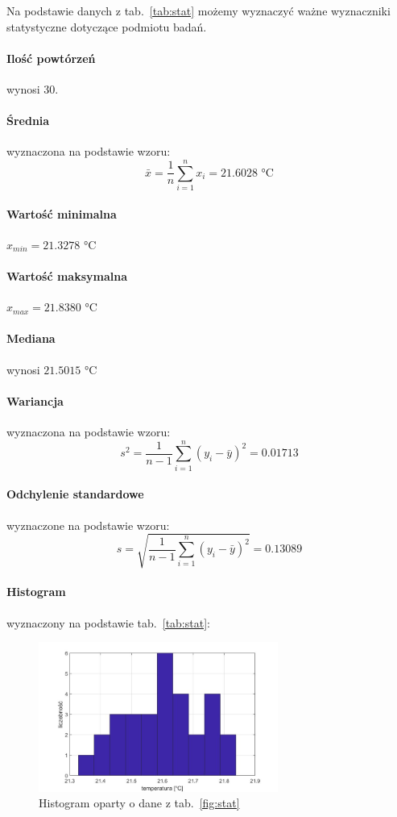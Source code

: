 \documentclass[a4paper, 12pt]{mwart}
\begin{document}
			Na podstawie danych z tab.~\ref{tab:stat} możemy wyznaczyć ważne wyznaczniki statystyczne
			dotyczące podmiotu badań.

			\paragraph{Ilość powtórzeń} wynosi 30.
			\paragraph{Średnia} wyznaczona na podstawie wzoru:
				$$ \bar{x} = \frac{1}{n} \sum_{i=1}^n x_i =  21.6028 \text{ °C}$$
			\paragraph{Wartość minimalna} $x_{min} = 21.3278 \text{ °C}$
			\paragraph{Wartość maksymalna} $x_{max} = 21.8380 \text{ °C}$ 
			\paragraph{Mediana} wynosi $21.5015 \text{ °C}$
			\paragraph{Wariancja} wyznaczona na podstawie wzoru:
			$$ s^2 = \frac{1}{n - 1} \sum_{i=1}^n (y_i - \bar{y})^2 = 0.01713$$

			\paragraph{Odchylenie standardowe} wyznaczone na podstawie wzoru:
			$$ s = \sqrt{\frac{1}{n - 1} \sum_{i=1}^n (y_i - \bar{y})^2} = 0.13089$$

			\clearpage
			\newpage

			\paragraph{Histogram} wyznaczony na podstawie tab.~\ref{tab:stat}: 

			\begin{figure}[h]
				\begin{center}
					\includegraphics[width = 0.7\textwidth]{graphs/hist.jpg}
					\caption{Histogram oparty o dane z tab.~\ref{fig:stat}}
					\label{fig:hist}
				\end{center}
			\end{figure}
\end{document}
